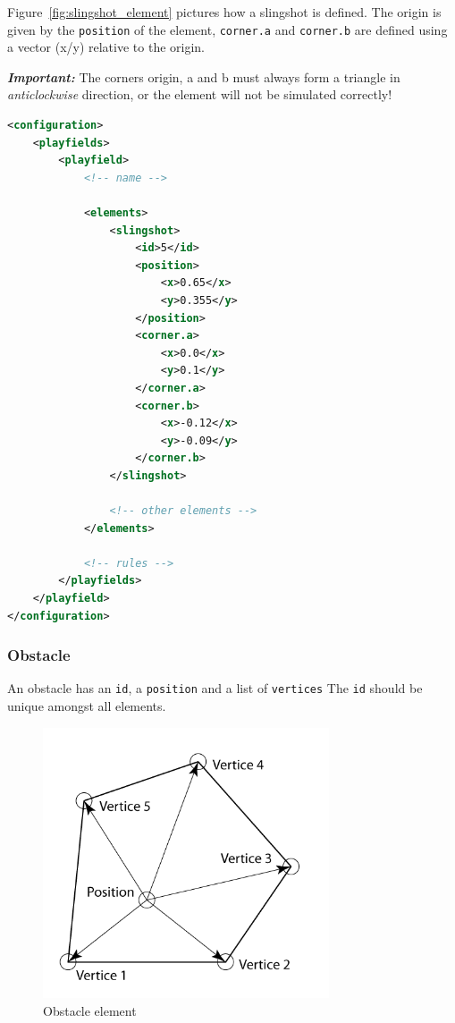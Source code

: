 \documentclass[fontsize=12pt,
               paper=a4,
               twoside=false,
               parskip=half,
               ]{scrartcl}
\begin{document}
Figure~\ref{fig:slingshot_element} pictures how a slingshot is defined. The origin is given by the \texttt{position} of the element, \texttt{corner.a} and \texttt{corner.b} are defined using a vector (x/y) relative to the origin.

\textbf{\textsl{Important:}} The corners origin, a and b must always form a triangle in \textsl{anticlockwise} direction, or the element will not be simulated correctly!

\begin{minipage}[]{\linewidth}
\begin{lstlisting}[language=xml,label=lst:slingshot,caption={slingshot}]
<configuration>
	<playfields>
		<playfield>
			<!-- name -->
			
			<elements>
				<slingshot>
					<id>5</id>
					<position>
						<x>0.65</x>
						<y>0.355</y>
					</position>
					<corner.a>
						<x>0.0</x>
						<y>0.1</y>
					</corner.a>
					<corner.b>
						<x>-0.12</x>
						<y>-0.09</y>
					</corner.b>
				</slingshot>
				
				<!-- other elements -->
			</elements>
			
			<!-- rules -->
		</playfields>
	</playfield>
</configuration>
\end{lstlisting}
\end{minipage}

\subsubsection{Obstacle}

An obstacle has an \texttt{id}, a \texttt{position} and a list of \texttt{vertices} The \texttt{id} should be unique amongst all elements. 

\begin{figure}[h!]
	\centering
	\includegraphics[height=8cm]{./img/manual/obstacle-element.png}
	\caption[Obstacle element]{Obstacle element}
	\label{fig:obstacle_element}
\end{figure}
\end{document}

